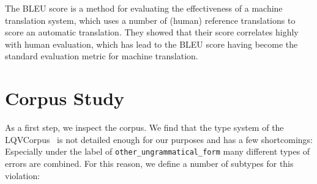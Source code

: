 \documentclass[a4paper,10pt]{scrartcl}
\theoremstyle{style}
\begin{document}
The BLEU score \citep{papineni2002bleu} is a method for evaluating the effectiveness of a machine translation system, which uses a number of (human) reference translations to score an automatic translation. They showed that their score correlates highly with human evaluation, which has lead to the BLEU score having become the standard evaluation metric for machine translation.

\section{Corpus Study}
\label{corpus_study}

As a first step, we inspect the corpus. We find that the type system of the LQVCorpus~\citep{valeeva} is not detailed enough for our purposes and has a few shortcomings: Especially under the label of \texttt{other\_ungrammatical\_form} many different types of errors are combined. For this reason, we define a number of subtypes for this violation:
\end{document}
